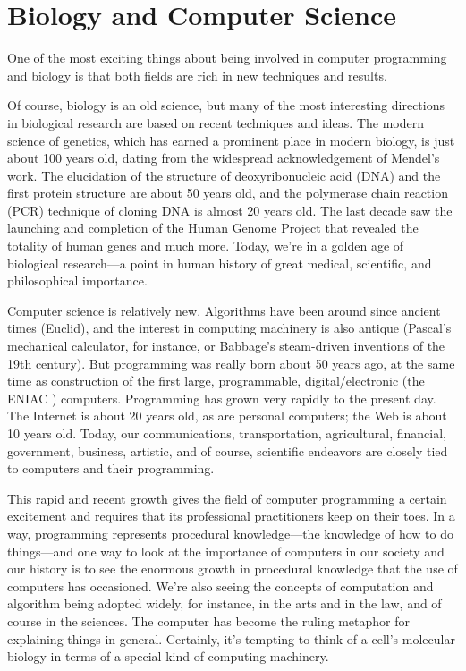 \chapter{Biology and Computer Science}
\label{chap:chapter1}
\minitoc

One of the most exciting things about being involved in computer programming and biology is that both fields are rich in new techniques and results.

Of course, biology is an old science, but many of the most interesting directions in biological research are based on recent techniques and ideas. The modern science of genetics, which has earned a prominent place in modern biology, is just about 100 years old, dating from the widespread acknowledgement of Mendel's work. The elucidation of the structure of deoxyribonucleic acid (DNA) and the first protein structure are about 50 years old, and the polymerase chain reaction (PCR) technique of cloning DNA is almost 20 years old. The last decade saw the launching and completion of the Human Genome Project that revealed the totality of human genes and much more. Today, we're in a golden age of biological research—a point in human history of great medical, scientific, and philosophical importance.

Computer science is relatively new. Algorithms have been around since ancient times (Euclid), and the interest in computing machinery is also antique (Pascal's mechanical calculator, for instance, or Babbage's steam-driven inventions of the 19th century). But programming was really born about 50 years ago, at the same time as construction of the first large, programmable, digital/electronic (the ENIAC ) computers. Programming has grown very rapidly to the present day. The Internet is about 20 years old, as are personal computers; the Web is about 10 years old. Today, our communications, transportation, agricultural, financial, government, business, artistic, and of course, scientific endeavors are closely tied to computers and their programming.

This rapid and recent growth gives the field of computer programming a certain excitement and requires that its professional practitioners keep on their toes. In a way, programming represents procedural knowledge—the knowledge of how to do things—and one way to look at the importance of computers in our society and our history is to see the enormous growth in procedural knowledge that the use of computers has occasioned. We're also seeing the concepts of computation and algorithm being adopted widely, for instance, in the arts and in the law, and of course in the sciences. The computer has become the ruling metaphor for explaining things in general. Certainly, it's tempting to think of a cell's molecular biology in terms of a special kind of computing machinery.

